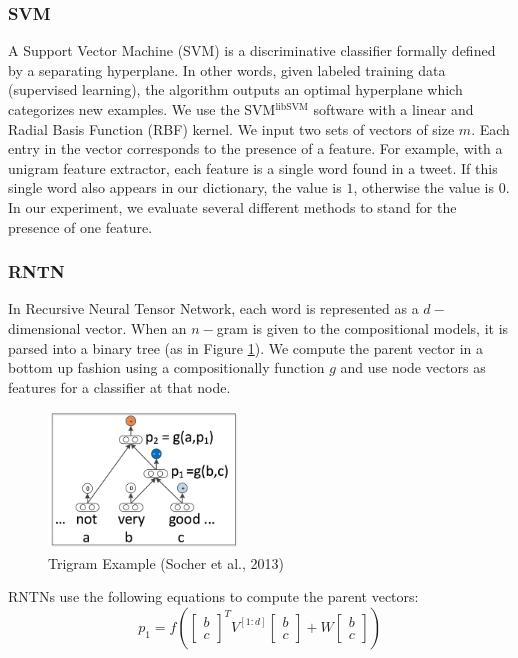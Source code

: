 \subsubsection{SVM}
\label{svm}
A Support Vector Machine (SVM) is a discriminative classifier formally defined by a separating hyperplane. In other words, given labeled training data (supervised learning), the algorithm outputs an optimal hyperplane which categorizes new examples. We use the SVM$^{\text{libSVM}}$ software with a linear and Radial Basis Function (RBF) kernel. We input two sets of vectors of size $m$. Each entry in the vector corresponds to the presence of a feature. For example, with a unigram feature extractor, each feature is a single word found in a tweet. If this single word also appears in our dictionary, the value is $1$, otherwise the value is $0$. In our experiment, we evaluate several different methods to stand for the presence of one feature. 



\newpage

\subsubsection{RNTN}
In Recursive Neural Tensor Network, each word is represented as a $d-$dimensional vector. When an $n-$gram is given to the compositional models, it is parsed into a binary tree (as in Figure \ref{trigram}). We compute the parent vector in a bottom up fashion using a compositionally function $g$ and use node vectors as features for a classifier at that node. 
\begin{figure}[H]
\begin{center}
\includegraphics[width = 0.45\textwidth]{pic/trigram.png}
\caption{\label{trigram}Trigram Example (Socher et al., 2013) }
\end{center}
\end{figure}

RNTNs use the following equations to compute the parent vectors: 
\begin{equation*}
p_1 = f \left(  
\begin{bmatrix}
b \\ c
\end{bmatrix}^T
V^{[1:d]} 
\begin{bmatrix}
b \\ c
\end{bmatrix}
+ W
\begin{bmatrix}
b \\ c
\end{bmatrix}
 \right)
\end{equation*}
 
